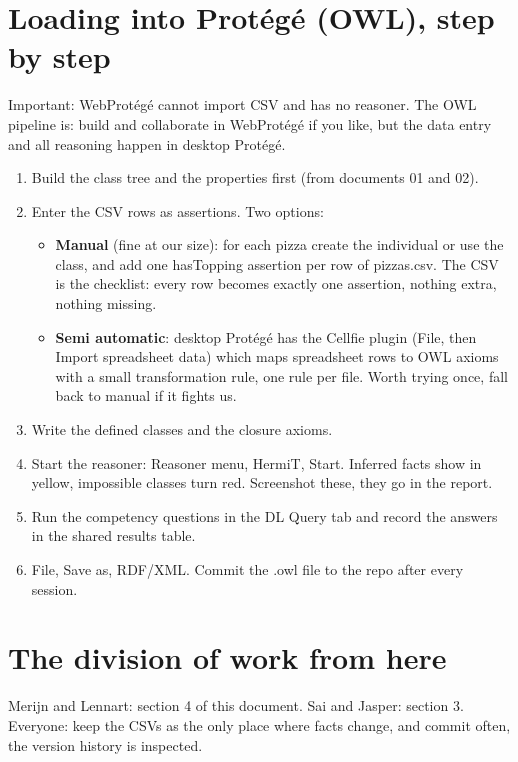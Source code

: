 \documentclass[11pt,a4paper]{article}
\begin{document}
\section{Loading into Prot\'eg\'e (OWL), step by step}
Important: WebProt\'eg\'e cannot import CSV and has no reasoner. The OWL pipeline is: build and collaborate in WebProt\'eg\'e if you like, but the data entry and all reasoning happen in desktop Prot\'eg\'e.
\begin{enumerate}[leftmargin=*, itemsep=2pt]
\item Build the class tree and the properties first (from documents 01 and 02).
\item Enter the CSV rows as assertions. Two options:
\begin{itemize}[leftmargin=*]
\item \textbf{Manual} (fine at our size): for each pizza create the individual or use the class, and add one hasTopping assertion per row of pizzas.csv. The CSV is the checklist: every row becomes exactly one assertion, nothing extra, nothing missing.
\item \textbf{Semi automatic}: desktop Prot\'eg\'e has the Cellfie plugin (File, then Import spreadsheet data) which maps spreadsheet rows to OWL axioms with a small transformation rule, one rule per file. Worth trying once, fall back to manual if it fights us.
\end{itemize}
\item Write the defined classes and the closure axioms.
\item Start the reasoner: Reasoner menu, HermiT, Start. Inferred facts show in yellow, impossible classes turn red. Screenshot these, they go in the report.
\item Run the competency questions in the DL Query tab and record the answers in the shared results table.
\item File, Save as, RDF/XML. Commit the .owl file to the repo after every session.
\end{enumerate}

\section{The division of work from here}
Merijn and Lennart: section 4 of this document. Sai and Jasper: section 3. Everyone: keep the CSVs as the only place where facts change, and commit often, the version history is inspected.
\end{document}
